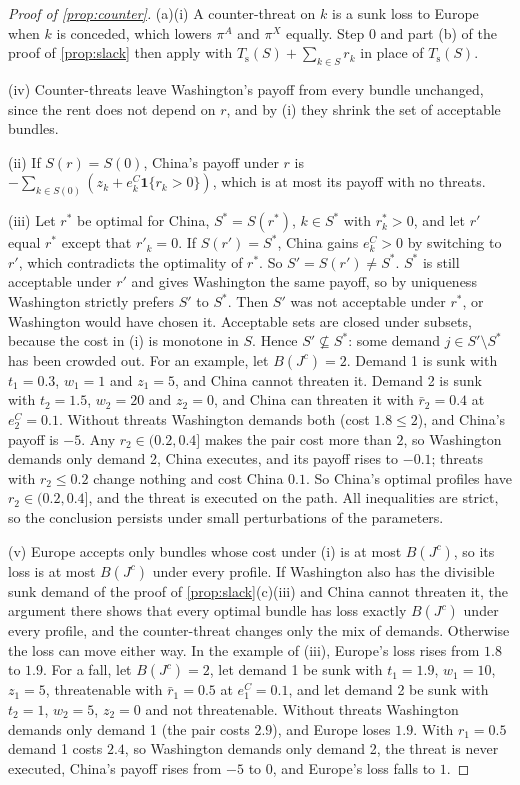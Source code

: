 \begin{proof}[Proof of \cref{prop:counter}]
(a)(i) A counter-threat on $k$ is a sunk loss to Europe when $k$ is conceded, which lowers $\pi^A$ and $\pi^X$ equally. Step 0 and part (b) of the proof of \cref{prop:slack} then apply with $T_{\mathrm s}(S)+\sum_{k\in S}r_k$ in place of $T_{\mathrm s}(S)$.

(iv) Counter-threats leave Washington's payoff from every bundle unchanged, since the rent does not depend on $r$, and by (i) they shrink the set of acceptable bundles.

(ii) If $S(r)=S(0)$, China's payoff under $r$ is $-\sum_{k\in S(0)}(z_k+e^C_k\mathbf 1\{r_k>0\})$, which is at most its payoff with no threats.

(iii) Let $r^*$ be optimal for China, $S^*=S(r^*)$, $k\in S^*$ with $r^*_k>0$, and let $r'$ equal $r^*$ except that $r'_k=0$. If $S(r')=S^*$, China gains $e^C_k>0$ by switching to $r'$, which contradicts the optimality of $r^*$. So $S'=S(r')\ne S^*$. $S^*$ is still acceptable under $r'$ and gives Washington the same payoff, so by uniqueness Washington strictly prefers $S'$ to $S^*$. Then $S'$ was not acceptable under $r^*$, or Washington would have chosen it. Acceptable sets are closed under subsets, because the cost in (i) is monotone in $S$. Hence $S'\not\subseteq S^*$: some demand $j\in S'\setminus S^*$ has been crowded out. For an example, let $B(J^c)=2$. Demand 1 is sunk with $t_1=0.3$, $w_1=1$ and $z_1=5$, and China cannot threaten it. Demand 2 is sunk with $t_2=1.5$, $w_2=20$ and $z_2=0$, and China can threaten it with $\bar r_2=0.4$ at $e^C_2=0.1$. Without threats Washington demands both (cost $1.8\le 2$), and China's payoff is $-5$. Any $r_2\in(0.2,0.4]$ makes the pair cost more than $2$, so Washington demands only demand 2, China executes, and its payoff rises to $-0.1$; threats with $r_2\le 0.2$ change nothing and cost China $0.1$. So China's optimal profiles have $r_2\in(0.2,0.4]$, and the threat is executed on the path. All inequalities are strict, so the conclusion persists under small perturbations of the parameters.

(v) Europe accepts only bundles whose cost under (i) is at most $B(J^c)$, so its loss is at most $B(J^c)$ under every profile. If Washington also has the divisible sunk demand of the proof of \cref{prop:slack}(c)(iii) and China cannot threaten it, the argument there shows that every optimal bundle has loss exactly $B(J^c)$ under every profile, and the counter-threat changes only the mix of demands. Otherwise the loss can move either way. In the example of (iii), Europe's loss rises from $1.8$ to $1.9$. For a fall, let $B(J^c)=2$, let demand 1 be sunk with $t_1=1.9$, $w_1=10$, $z_1=5$, threatenable with $\bar r_1=0.5$ at $e^C_1=0.1$, and let demand 2 be sunk with $t_2=1$, $w_2=5$, $z_2=0$ and not threatenable. Without threats Washington demands only demand 1 (the pair costs $2.9$), and Europe loses $1.9$. With $r_1=0.5$ demand 1 costs $2.4$, so Washington demands only demand 2, the threat is never executed, China's payoff rises from $-5$ to $0$, and Europe's loss falls to $1$.


\end{proof}
